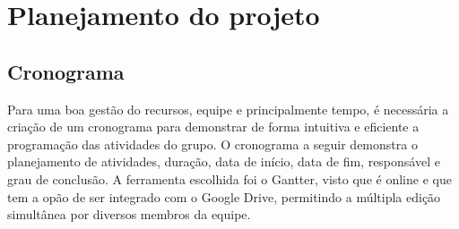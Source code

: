 \chapter[Planejamento do projeto]{Planejamento do projeto}


\section{\large{Cronograma}} 

\tab Para uma boa gestão do recursos, equipe e principalmente tempo, é necessária a criação de um cronograma para demonstrar de forma intuitiva e eficiente a programação das atividades do grupo. O cronograma a seguir demonstra o planejamento de atividades, duração, data de início, data de fim, responsável e grau de conclusão. A ferramenta escolhida foi o Gantter, visto que é online e que tem a opão de ser integrado com o Google Drive, permitindo a múltipla edição simultânea por diversos membros da equipe. \\
 